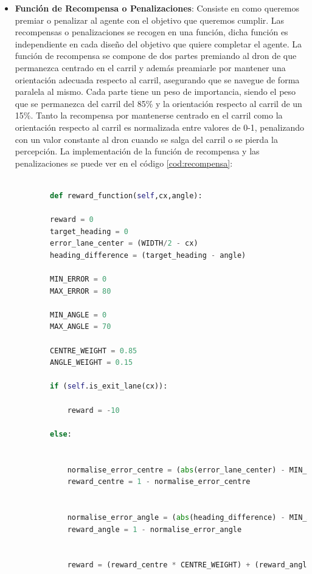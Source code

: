 \begin{itemize}
    \item \textbf{Función de Recompensa o Penalizaciones}: Consiste en como queremos premiar o penalizar al agente con el objetivo que queremos cumplir. Las recompensas o penalizaciones se recogen
    en una función, dicha función es independiente en cada diseño del objetivo que quiere completar el agente. La función de recompensa se compone de dos partes premiando al dron de que
    permanezca centrado en el carril y además preamiarle por mantener una orientación adecuada respecto al carril, asegurando que se navegue de forma paralela al mismo. Cada parte tiene un peso
    de importancia, siendo el peso que se permanezca del carril del 85\% y la orientación respecto al carril de un 15\%. Tanto la recompensa por mantenerse centrado en el carril 
    como la orientación respecto al carril es normalizada entre valores de 0-1, penalizando con un valor constante al dron cuando se salga del carril o 
    se pierda la percepción. La implementación de la función de recompensa y las penalizaciones se puede ver en el código \ref{cod:recompensa}:

    \begin{code}[H]
      \begin{lstlisting}[language=Python]
  
        def reward_function(self,cx,angle):

        reward = 0
        target_heading = 0
        error_lane_center = (WIDTH/2 - cx)
        heading_difference = (target_heading - angle) 
        
        MIN_ERROR = 0
        MAX_ERROR = 80

        MIN_ANGLE = 0
        MAX_ANGLE = 70

        CENTRE_WEIGHT = 0.85
        ANGLE_WEIGHT = 0.15
        
        if (self.is_exit_lane(cx)):
            
            reward = -10

        else:

            
            normalise_error_centre = (abs(error_lane_center) - MIN_ERROR) / (MAX_ERROR - MIN_ERROR)
            reward_centre = 1 - normalise_error_centre

            
            normalise_error_angle = (abs(heading_difference) - MIN_ANGLE) / (MAX_ANGLE - MIN_ANGLE)
            reward_angle = 1 - normalise_error_angle


            reward = (reward_centre * CENTRE_WEIGHT) + (reward_angle * ANGLE_WEIGHT)
            

\end{lstlisting}
\end{code}
\end{itemize}

